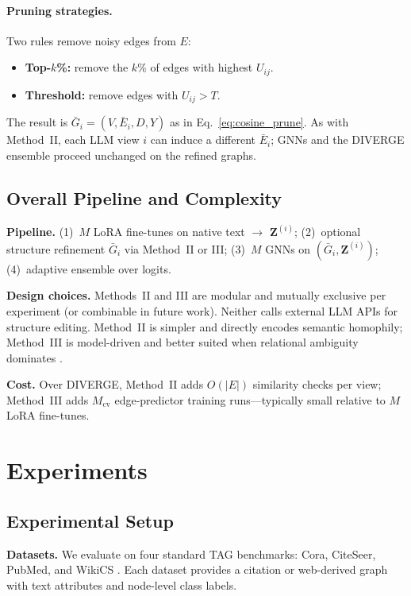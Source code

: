 \documentclass{article}
\begin{document}
\paragraph{Pruning strategies.}
Two rules remove noisy edges from $E$:
\begin{itemize}
\item \textbf{Top-$k$\%:} remove the $k$\% of edges with highest $U_{ij}$.
\item \textbf{Threshold:} remove edges with $U_{ij}>T$.
\end{itemize}
The result is $\bar{G}_i=(V,\bar{E}_i,D,Y)$ as in Eq.~\eqref{eq:cosine_prune}.
As with Method~II, each LLM view $i$ can induce a different $\bar{E}_i$; GNNs and
the DIVERGE ensemble proceed unchanged on the refined graphs.


\subsection{Overall Pipeline and Complexity}
\label{sec:pipeline-summary}

\textbf{Pipeline.} (1)~$M$ LoRA fine-tunes on native text $\rightarrow$
$\mathbf{Z}^{(i)}$; (2)~optional structure refinement
$\bar{G}_i$ via Method~II or III; (3)~$M$ GNNs on
$(\bar{G}_i,\mathbf{Z}^{(i)})$; (4)~adaptive ensemble over logits.

\textbf{Design choices.} Methods~II and III are modular and mutually exclusive per
experiment (or combinable in future work). Neither calls external LLM APIs for
structure editing. Method~II is simpler and directly encodes semantic homophily;
Method~III is model-driven and better suited when relational ambiguity dominates
\citep{yu2020grcn,zhao2021gaug}.

\textbf{Cost.} Over DIVERGE, Method~II adds $O(|E|)$ similarity checks per view;
Method~III adds $M_{\mathrm{cv}}$ edge-predictor training runs---typically small
relative to $M$ LoRA fine-tunes.

\section{Experiments}
\label{sec:experiments}

\subsection{Experimental Setup}
\textbf{Datasets.} We evaluate on four standard TAG benchmarks: Cora, CiteSeer, PubMed,
and WikiCS \citep{cora,giles1998citeseer,pubmed,mernyei2020wikics}. Each dataset
provides a citation or web-derived graph with text attributes and node-level class labels.
\end{document}
